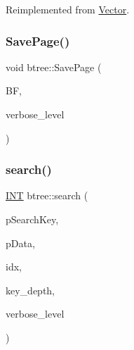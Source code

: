 Reimplemented from \mbox{\hyperlink{class_vector_a20550e70d02cbe484032c7f6b0833a0f}{Vector}}.

\mbox{\label{classbtree_a2dd55fa54a2db4dfd5746d2f27835e26}} 
\subsubsection{\texorpdfstring{Save\+Page()}{SavePage()}}
{\footnotesize\ttfamily void btree\+::\+Save\+Page (\begin{DoxyParamCaption}\item[{\mbox{\hyperlink{discreta_8h_a4966414b761cd8d10ba385fe5e7c07fc}{Buffer}} $\ast$}]{BF,  }\item[{\mbox{\hyperlink{galois_8h_a09fddde158a3a20bd2dcadb609de11dc}{I\+NT}}}]{verbose\+\_\+level }\end{DoxyParamCaption})}

\mbox{\label{classbtree_a0aea262fd4da610b2276f7742fc999d5}} 
\subsubsection{\texorpdfstring{search()}{search()}}
{\footnotesize\ttfamily \mbox{\hyperlink{galois_8h_a09fddde158a3a20bd2dcadb609de11dc}{I\+NT}} btree\+::search (\begin{DoxyParamCaption}\item[{void $\ast$}]{p\+Search\+Key,  }\item[{\mbox{\hyperlink{discreta_8h_abf512b6b30146dda9c59049478bf3e99}{D\+A\+T\+A\+T\+Y\+PE}} $\ast$}]{p\+Data,  }\item[{\mbox{\hyperlink{galois_8h_a09fddde158a3a20bd2dcadb609de11dc}{I\+NT}} $\ast$}]{idx,  }\item[{\mbox{\hyperlink{galois_8h_a09fddde158a3a20bd2dcadb609de11dc}{I\+NT}}}]{key\+\_\+depth,  }\item[{\mbox{\hyperlink{galois_8h_a09fddde158a3a20bd2dcadb609de11dc}{I\+NT}}}]{verbose\+\_\+level }\end{DoxyParamCaption})}

\mbox{\label{classbtree_a346c06a9e28986d1e28065fb935eee35}} 
